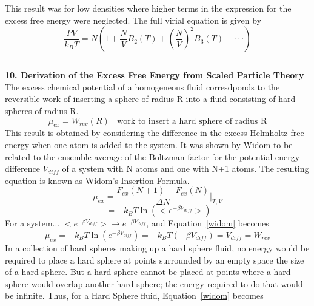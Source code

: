 \documentclass[12pt]{article}
\begin{document}
\color{red}This result was for low densities where higher terms in the expression for the excess free energy were neglected. The full virial equation is given by\color{black}
\begin{equation}\frac{PV}{k_BT}=N\left(1+\frac{N}{V}B_2(T)+\left(\frac{N}{V}\right)^2B_3(T)+ \cdot\cdot\cdot\right) \end{equation}

\[{}\]

\noindent \textbf{10. Derivation of the Excess Free Energy from Scaled Particle Theory}
The excess chemical potential of a homogeneous fluid corresdponds to the reversible work of inserting a sphere of radius R 
into a fluid consisting of hard spheres of radius R. 
\begin{displaymath}\mu_{ex}=W_{rev}(R){~~~~}\text{work to insert a hard sphere of radius R}\end{displaymath}
This result is obtained by considering the difference in the excess Helmholtz free energy when one atom is added to the system. 
It was shown by Widom to be related to the ensemble average of the Boltzman factor for the potential energy difference $V_{diff}$ 
of a system with N atoms and one with N+1 atoms. The resulting equation is known as Widom's Insertion Formula.
\begin{equation}\mu_{ex}=\frac{F_{ex}(N+1)-F_{ex}(N)}{\Delta{N}}\bigg|_{T,V}\end{equation}
\begin{equation}\label{widom}{~}=-k_BT\ln\left(<e^{-\beta{V_{diff}}}>\right)\end{equation}
\color{red}For a system... $<e^{-\beta{V_{diff}}}> \rightarrow e^{-\beta{V_{diff}}}$, and Equation~\ref{widom} becomes 
\begin{equation}\mu_{ex}=-k_BT\ln\left(e^{-\beta{V_{diff}}}\right)=-k_BT(-\beta{V}_{diff})=V_{diff}=W_{rev}\end{equation}\color{black}
\indent In a collection of hard spheres making up a hard sphere fluid, no energy would be required to place a hard sphere at points 
surrounded by an empty space the size of a hard sphere. But a hard sphere cannot be placed at points where a hard sphere would 
overlap another hard sphere; the energy required to do that would be infinite. Thus, for a Hard Sphere fluid, Equation~\ref{widom} becomes
\end{document}
